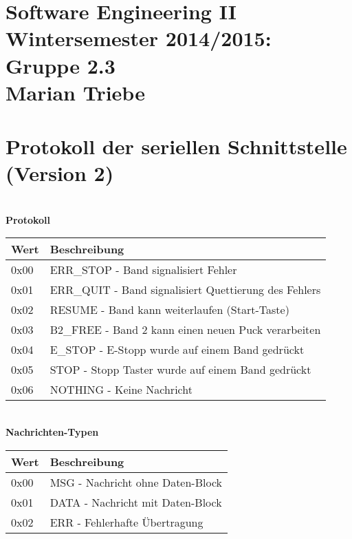 \documentclass[a4paper,10pt]{article}
\begin{document}
  \section*{\small{Software Engineering II \\ Wintersemester 2014/2015: Gruppe 2.3 \\ Marian Triebe}}
  \section*{Protokoll der seriellen Schnittstelle (Version 2)}
  \textbf{\\ {\large Protokoll}}\\
  \newline
  \begin{tabular}{|l|l|}
    \hline
    \rowcolor{lightgray}\textbf{Wert} & \textbf{Beschreibung}\\
    \hline
    0x00 & ERR\_STOP - Band signalisiert Fehler\\
    \hline
    0x01 & ERR\_QUIT - Band signalisiert Quettierung des Fehlers\\
    \hline
    0x02 & RESUME - Band kann weiterlaufen (Start-Taste)\\
    \hline
    0x03 & B2\_FREE - Band 2 kann einen neuen Puck verarbeiten\\
    \hline
    0x04 & E\_STOP - E-Stopp wurde auf einem Band gedrückt\\
    \hline
    0x05 & STOP - Stopp Taster wurde auf einem Band gedrückt\\
    \hline
    0x06 & NOTHING - Keine Nachricht\\
    \hline
  \end{tabular}
  \newline \newline
  
  \textbf{\\ {\large Nachrichten-Typen}}\\
  \newline
  \begin{tabular}{|l|l|}
    \hline
    \rowcolor{lightgray}\textbf{Wert} & \textbf{Beschreibung}\\
    \hline
    0x00 & MSG - Nachricht ohne Daten-Block\\
    \hline
    0x01 & DATA - Nachricht mit Daten-Block\\
    \hline
    0x02 & ERR - Fehlerhafte Übertragung\\
    \hline
  \end{tabular}
  \newline \newline
 
\end{document}
